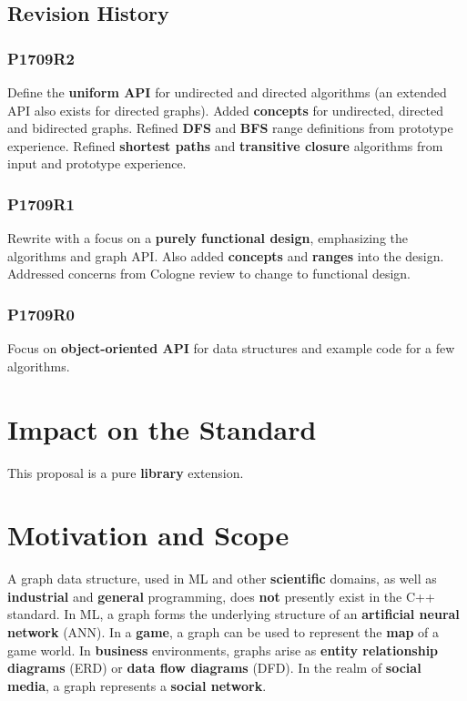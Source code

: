 \documentclass[10pt,onecolumn]{article}
\begin{document}
\subsection{Revision History}
\subsubsection*{P1709R2}
Define the \textbf{uniform API} for undirected and directed algorithms (an extended API also exists for directed graphs). Added \textbf{concepts} for undirected, directed and bidirected graphs. Refined \textbf{DFS} and \textbf{BFS} range definitions from prototype experience. Refined \textbf{shortest paths} and \textbf{transitive closure} algorithms from input and prototype experience.

\subsubsection*{P1709R1}
Rewrite with a focus on a \textbf{purely functional design}, emphasizing the algorithms and graph API. Also added \textbf{concepts} and \textbf{ranges} into the design. Addressed concerns from Cologne review to change to functional design.

\subsubsection*{P1709R0}
Focus on \textbf{object-oriented API} for data structures and example code for a few algorithms.

\section{Impact on the Standard}
This proposal is a pure \textbf{library} extension.

\section{Motivation and Scope}
A graph data structure, used in ML and other \textbf{scientific} domains, as well as \textbf{industrial} and \textbf{general} programming, does \textbf{not} presently exist in the C++ standard. In ML, a graph forms the underlying structure of an \textbf{artificial neural network} (ANN). In a \textbf{game}, a graph can be used to
represent the \textbf{map} of a game world. In \textbf{business} environments, graphs arise as \textbf{entity relationship diagrams} (ERD) or \textbf{data flow diagrams} (DFD). In the realm of \textbf{social media}, a graph represents a \textbf{social network}.
\end{document}
